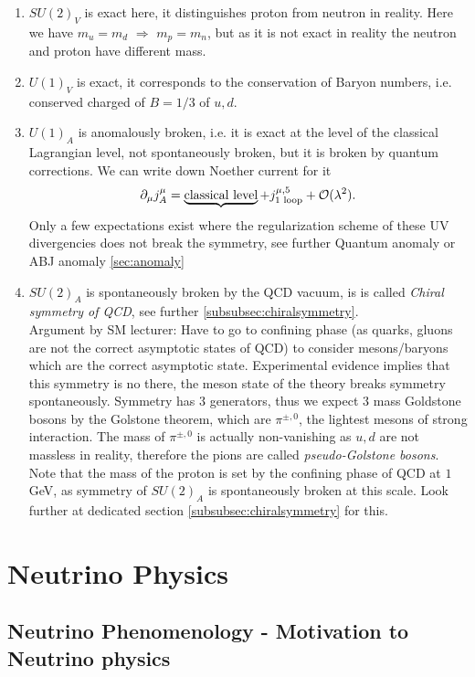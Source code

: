 \begin{enumerate}
	\item $SU(2)_V$ is exact here, it distinguishes proton from neutron in reality. Here we have $m_u=m_d$ $\Rightarrow$ $m_p=m_n$, but as it is not exact in reality the neutron and proton have different mass.
	\item $U(1)_V$ is exact, it corresponds to the conservation of Baryon numbers, i.e. conserved charged of $B=1/3$ of $u,d$.
	\item $U(1)_A$ is anomalously broken, i.e. it is exact at the level of the classical Lagrangian level, not spontaneously broken, but it is broken by quantum corrections. We can write down Noether current for it
	\begin{equation*}
	\partial_\mu j^\mu_A = \underbrace{\text{classical level}} + j^{\mu, 5}_{\text{1 loop}} + \mathcal{O}(\lambda^2).
	\end{equation*}
	Only a few expectations exist where the regularization scheme of these UV divergencies does not break the symmetry, see further Quantum anomaly or ABJ anomaly \ref{sec:anomaly}
	\item $SU(2)_A$ is spontaneously broken by the QCD vacuum, is is called \emph{Chiral symmetry of QCD}, see further \ref{subsubsec:chiralsymmetry}. \\
	Argument by SM lecturer: Have to go to confining phase (as quarks, gluons are not the correct asymptotic states of QCD) to consider mesons/baryons which are the correct asymptotic state. Experimental evidence implies that this symmetry is no there, the meson state of the theory breaks symmetry spontaneously. Symmetry has $3$ generators, thus we expect $3$ mass Goldstone bosons by the Golstone theorem, which are $\pi^{\pm,0}$, the lightest mesons of strong interaction. The mass of $\pi^{\pm,0}$ is actually non-vanishing as $u,d$ are not massless in reality, therefore the pions are called \emph{pseudo-Golstone bosons}.
	Note that the mass of the proton is set by the confining phase of QCD at $1$GeV, as symmetry of $SU(2)_A$ is spontaneously broken at this scale. Look further at dedicated section \ref{subsubsec:chiralsymmetry} for this.
 \end{enumerate}



\section{Neutrino Physics}
\subsection{Neutrino Phenomenology - Motivation to Neutrino physics}
